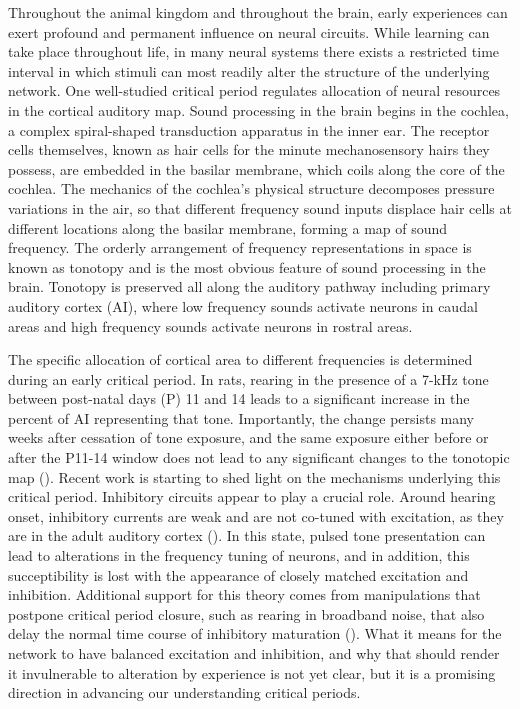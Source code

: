 Throughout the animal kingdom and throughout the brain, early experiences can exert profound and permanent influence on neural circuits. While learning can take place throughout life, in many neural systems there exists a restricted time interval in which stimuli can most readily alter the structure of the underlying network. One well-studied critical period regulates allocation of neural resources in the cortical auditory map. Sound processing in the brain begins in the cochlea, a complex spiral-shaped transduction apparatus in the inner ear. The receptor cells themselves, known as hair cells for the minute mechanosensory hairs they possess, are embedded in the basilar membrane, which coils along the core of the cochlea. The mechanics of the cochlea's physical structure decomposes pressure variations in the air, so that different frequency sound inputs displace hair cells at different locations along the basilar membrane, forming a map of sound frequency. The orderly arrangement of frequency representations in space is known as tonotopy and is the most obvious feature of sound processing in the brain. Tonotopy is preserved all along the auditory pathway including primary auditory cortex (AI), where low frequency sounds activate neurons in caudal areas and high frequency sounds activate neurons in rostral areas.

The specific allocation of cortical area to different frequencies is determined during an early critical period. In rats, rearing in the presence of a 7-kHz tone between post-natal days (P) 11 and 14 leads to a significant increase in the percent of AI representing that tone. Importantly, the change persists many weeks after cessation of tone exposure, and the same exposure either before or after the P11-14 window does not lead to any significant changes to the tonotopic map (\cite{DeVillers-Sidani2007}). Recent work is starting to shed light on the mechanisms underlying this critical period. Inhibitory circuits appear to play a crucial role. Around hearing onset, inhibitory currents are weak and are not co-tuned with excitation, as they are in the adult auditory cortex (\cite{Dorrn2010}). In this state, pulsed tone presentation can lead to alterations in the frequency tuning of neurons, and in addition, this succeptibility is lost with the appearance of closely matched excitation and inhibition. Additional support for this theory comes from manipulations that postpone critical period closure, such as rearing in broadband noise, that also delay the normal time course of inhibitory maturation (\cite{DeVillers-Sidani2008}). What it means for the network to have balanced excitation and inhibition, and why that should render it invulnerable to alteration by experience is not yet clear, but it is a promising direction in advancing our understanding critical periods.

